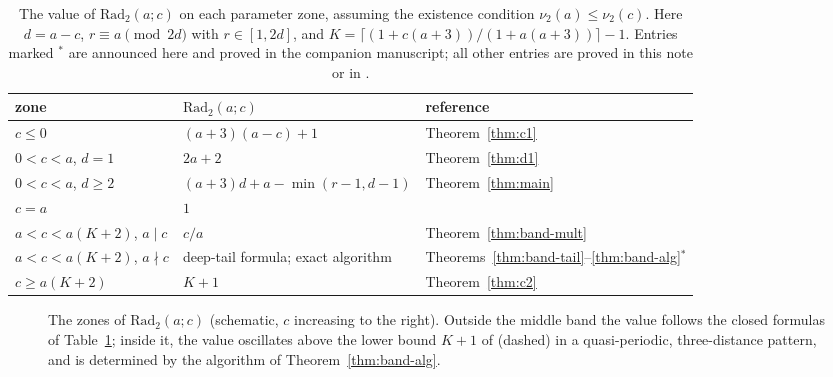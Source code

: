 \documentclass[11pt]{article}
\theoremstyle{remark}
\theoremstyle{definition}
\newcommand{\Rad}{\mathrm{Rad}_2}
\newcommand{\vtwo}{\nu_2}
\begin{document}
\begin{table}[ht]
\centering
\begin{tabular}{lll}
\hline
zone & $\Rad(a;c)$ & reference \\
\hline
$c \le 0$ & $(a+3)(a-c)+1$ & Theorem~\ref{thm:c1} \\
$0 < c < a$, $d = 1$ & $2a+2$ & Theorem~\ref{thm:d1} \\
$0 < c < a$, $d \ge 2$ & $(a+3)d + a - \min(r-1,d-1)$ & Theorem~\ref{thm:main} \\
$c = a$ & $1$ & \cite{DT2020} \\
$a < c < a(K+2)$, $a \mid c$ & $c/a$ & Theorem~\ref{thm:band-mult} \\
$a < c < a(K+2)$, $a \nmid c$ & deep-tail formula; exact algorithm &
Theorems~\ref{thm:band-tail}--\ref{thm:band-alg}$^{*}$ \\
$c \ge a(K+2)$ & $K+1$ & Theorem~\ref{thm:c2} \\
\hline
\end{tabular}
\caption{The value of $\Rad(a;c)$ on each parameter zone, assuming the
existence condition $\vtwo(a) \le \vtwo(c)$. Here $d = a-c$,
$r \equiv a \pmod{2d}$ with $r \in [1,2d]$, and
$K = \lceil (1+c(a+3))/(1+a(a+3)) \rceil - 1$. Entries marked $^{*}$ are
announced here and proved in the companion manuscript; all other entries
are proved in this note or in \cite{DT2020}.}
\label{tab:summary}
\end{table}

\begin{figure}[ht]
\centering
{}
\caption{The zones of $\Rad(a;c)$ (schematic, $c$ increasing to the right).
Outside the middle band the value follows the closed formulas of
Table~\ref{tab:summary}; inside it, the value oscillates above the lower
bound $K+1$ of \cite{DT2020} (dashed) in a quasi-periodic, three-distance
pattern, and is determined by the algorithm of Theorem~\ref{thm:band-alg}.}
\label{fig:zones}
\end{figure}
\end{document}
